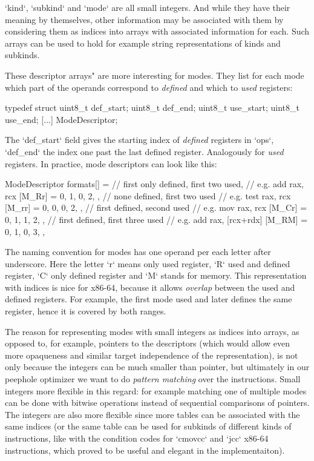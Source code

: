 `kind`, `subkind` and `mode` are all small integers. And while
they have their meaning by themselves, other information may be associated with
them by considering them as indices into arrays with associated information for
each. Such arrays can be used to hold for example string representations of
kinds and subkinds.

These \"descriptor arrays" are more interesting for modes. They list for each
mode which part of the operands correspond to {\em defined} and which to {\em
used} registers:

\begtt
typedef struct {
	uint8_t def_start;
	uint8_t def_end;
	uint8_t use_start;
	uint8_t use_end;
	[...]
} ModeDescriptor;
\endtt

The `def_start` field gives the starting index of {\em defined} registers in `ops`,
`def_end` the index one past the last defined register. Analogously for {\em
used} registers. In practice, mode descriptors can look like this:

\begtt
ModeDescriptor formats[] = {
	// first only defined, first two used,
	// e.g. add rax, rcx
	[M_Rr] = { 0, 1, 0, 2, },
	// none defined, first two used
	// e.g. test rax, rcx
	[M_rr] = { 0, 0, 0, 2, },
	// first defined, second used
	// e.g. mov rax, rcx
	[M_Cr] = { 0, 1, 1, 2, },
	 // first defined, first three used
	// e.g. add rax, [rcx+rdx]
	[M_RM] = { 0, 1, 0, 3, },
}
\endtt

The naming convention for modes has one operand per each letter after
underscore. Here the letter `r` means only used register, `R` used and defined register,
`C` only defined register and `M` stands for memory. This representation with
indices is nice for x86-64, because it allows {\em overlap} between the used and
defined registers. For example, the first mode used and later defines the same
register, hence it is covered by both ranges.

The reason for representing modes with small integers as indices into arrays, as
opposed to, for example, pointers to the descriptors (which would allow even
more opaqueness and similar target independence of the representation), is
not only because the integers can be much smaller than pointer, but ultimately
in our peephole optimizer we want to do {\em pattern matching} over the
instructions. Small integers more flexible in this regard: for
example matching one of multiple modes can be done with bitwise operations
instead of sequential comparisons of pointers. The integers are also more
flexible since more tables can be associated with the same indices (or the same
table can be used for subkinds of different kinds of instructions, like with the
condition codes for `cmovcc` and `jcc` x86-64 instructions, which proved to be
useful and elegant in the implementaiton).

